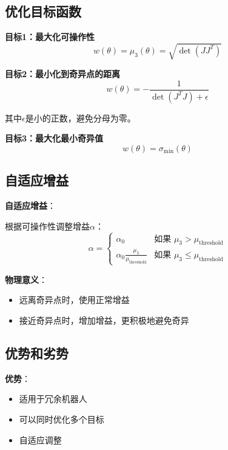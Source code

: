 \documentclass[12pt,a4paper]{article}
\begin{document}
\subsection{优化目标函数}

\textbf{目标1：最大化可操作性}
\begin{equation}
w(\theta) = \mu_3(\theta) = \sqrt{\det(JJ^T)}
\end{equation}

\textbf{目标2：最小化到奇异点的距离}
\begin{equation}
w(\theta) = -\frac{1}{\det(J^T J) + \epsilon}
\end{equation}

其中$\epsilon$是小的正数，避免分母为零。

\textbf{目标3：最大化最小奇异值}
\begin{equation}
w(\theta) = \sigma_{\min}(\theta)
\end{equation}

\subsection{自适应增益}

\textbf{自适应增益}：

根据可操作性调整增益$\alpha$：
\begin{equation}
\alpha = \begin{cases}
\alpha_0 & \text{如果 } \mu_3 > \mu_{\text{threshold}} \\
\alpha_0 \frac{\mu_3}{\mu_{\text{threshold}}} & \text{如果 } \mu_3 \leq \mu_{\text{threshold}}
\end{cases}
\end{equation}

\textbf{物理意义}：
\begin{itemize}
\item 远离奇异点时，使用正常增益
\item 接近奇异点时，增加增益，更积极地避免奇异
\end{itemize}

\subsection{优势和劣势}

\textbf{优势}：
\begin{itemize}
\item 适用于冗余机器人
\item 可以同时优化多个目标
\item 自适应调整
\end{itemize}
\end{document}
